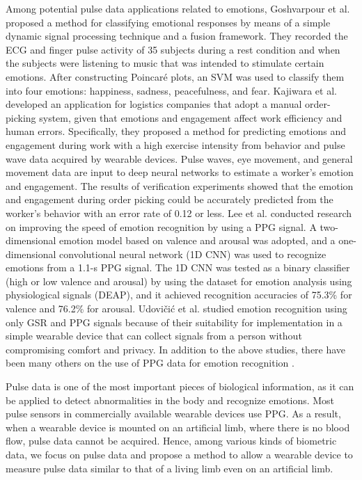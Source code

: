 \documentclass{ieeeaccess}
\begin{document}
Among potential pulse data applications related to emotions, Goshvarpour et al. \cite{emotion_recognition1} proposed a method for classifying emotional responses by means of a simple dynamic signal processing technique and a fusion framework. They recorded the ECG and finger pulse activity of 35 subjects during a rest condition and when the subjects were listening to music that was intended to stimulate certain emotions. After constructing Poincar\'e plots, an SVM was used to classify them into four emotions: happiness, sadness, peacefulness, and fear. Kajiwara et al. \cite{emotion_recognition2} developed an application for logistics companies that adopt a manual order-picking system, given that emotions and engagement affect work efficiency and human errors. Specifically, they proposed a method for predicting emotions and engagement during work with a high exercise intensity from behavior and pulse wave data acquired by wearable devices. Pulse waves, eye movement, and general movement data are input to deep neural networks to estimate a worker's emotion and engagement. The results of verification experiments showed that the emotion and engagement during order picking could be accurately predicted from the worker's behavior with an error rate of 0.12 or less. Lee et al. \cite{emotion_recognition3} conducted research on improving the speed of emotion recognition by using a PPG signal. A two-dimensional emotion model based on valence and arousal was adopted, and a one-dimensional convolutional neural network (1D CNN) was used to recognize emotions from a 1.1-s PPG signal. The 1D CNN was tested as a binary classifier (high or low valence and arousal) by using the dataset for emotion analysis using physiological signals (DEAP), and it achieved recognition accuracies of 75.3\% for valence and 76.2\% for arousal. Udovi\v{c}i\'{c} et al. \cite{emotion_recognition4} studied emotion recognition using only GSR and PPG signals because of their suitability for implementation in a simple wearable device that can collect signals from a person without compromising comfort and privacy. In addition to the above studies, there have been many others on the use of PPG data for emotion recognition \cite{emotion_recognition5, emotion_recognition6, emotion_recognition7}.\par

Pulse data is one of the most important pieces of biological information, as it can be applied to detect abnormalities in the body and recognize emotions. Most pulse sensors in commercially available wearable devices use PPG. As a result, when a wearable device is mounted on an artificial limb, where there is no blood flow, pulse data cannot be acquired. Hence, among various kinds of biometric data, we focus on pulse data and propose a method to allow a wearable device to measure pulse data similar to that of a living limb even on an artificial limb.
\end{document}
